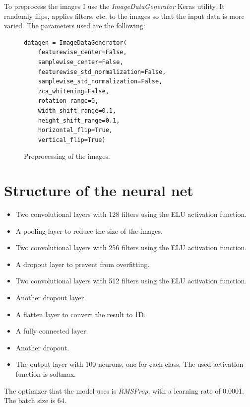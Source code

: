 \documentclass[12pt,english]{article}
\begin{document}
To preprocess the images I use the \emph{ImageDataGenerator} Keras utility. It randomly flips, applies filters, etc. to the images so that the input data is more varied. The parameters used are the following:

\begin{figure}[H]
\centering
\begin{verbatim}
datagen = ImageDataGenerator(
    featurewise_center=False,  
    samplewise_center=False,  
    featurewise_std_normalization=False,  
    samplewise_std_normalization=False, 
    zca_whitening=False,  
    rotation_range=0,
    width_shift_range=0.1,
    height_shift_range=0.1,
    horizontal_flip=True,  
    vertical_flip=True) 
\end{verbatim}
\caption{Preprocessing of the images.}
\end{figure}

\section{Structure of the neural net}

\begin{itemize}
	\item Two convolutional layers with 128 filters using the ELU activation function.
	\item A pooling layer to reduce the size of the images.
	\item Two convolutional layers with 256 filters using the ELU activation function.
	\item A dropout layer to prevent from overfitting.
	\item Two convolutional layers with 512 filters using the ELU activation function.
	\item Another dropout layer.
	\item A flatten layer to convert the result to 1D.
	\item A fully connected layer.
	\item Another dropout.
	\item The output layer with 100 neurons, one for each class. The used activation function is softmax.
\end{itemize}

The optimizer that the model uses is \emph{RMSProp}, with a learning rate of 0.0001. The batch size is 64.
\end{document}
